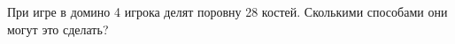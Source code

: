 \question
При игре в домино 4 игрока делят поровну 28 костей. Сколькими способами они могут это сделать?